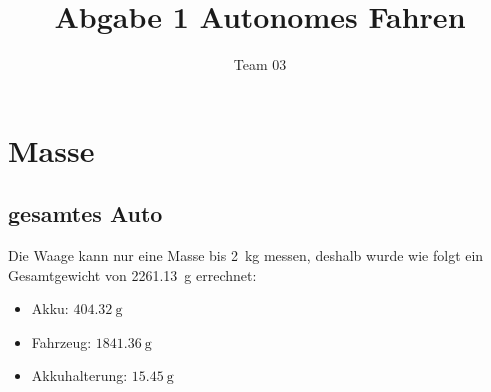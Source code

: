 \documentclass[11pt]{article}
\author{Team 03}
\title{Abgabe 1 Autonomes Fahren}
\begin{document}
\maketitle
\tableofcontents

\section{Masse}

    \subsection{gesamtes Auto}
    Die Waage kann nur eine Masse bis \SI{2}{\kilogram} messen, deshalb wurde wie folgt ein Gesamtgewicht von \SI{2261,13}{\gram} errechnet:
    \begin{itemize}
        \item Akku: $\SI{404,32}{\gram}$
        \item Fahrzeug: $\SI{1841,36}{\gram}$
        \item Akkuhalterung: $\SI{15,45}{\gram}$
    \end{itemize}
\end{document}
